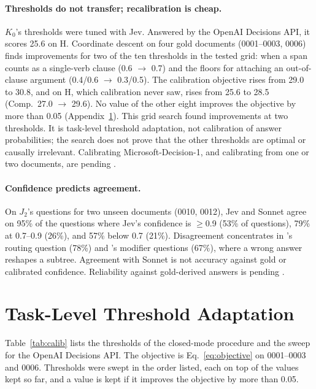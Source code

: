 \paragraph{Thresholds do not transfer; recalibration is cheap.}
$K_0$'s thresholds were tuned with Jev. Answered by the OpenAI Decisions API, it scores 25.6 \F on H. Coordinate descent on four gold documents (0001--0003, 0006) finds improvements for two of the ten thresholds in the tested grid: when a span counts as a single-verb clause (0.6 $\rightarrow$ 0.7) and the floors for attaching an out-of-clause argument (0.4/0.6 $\rightarrow$ 0.3/0.5). The calibration objective rises from 29.0 to 30.8, and on H, which calibration never saw, \F rises from 25.6 to 28.5 (Comp.\ 27.0 $\rightarrow$ 29.6). No value of the other eight improves the objective by more than 0.05 (Appendix~\ref{app:calib}). This grid search found improvements at two thresholds. It is task-level threshold adaptation, not calibration of answer probabilities; the search does not prove that the other thresholds are optimal or causally irrelevant. Calibrating Microsoft-Decision-1, and calibrating from one or two documents, are pending .

\paragraph{Confidence predicts agreement.}
On $J_2$'s questions for two unseen documents (0010, 0012), Jev and Sonnet agree on 95\% of the questions where Jev's confidence is $\geq$0.9 (53\% of questions), 79\% at 0.7--0.9 (26\%), and 57\% below 0.7 (21\%). Disagreement concentrates in 's routing question (78\%) and 's modifier questions (67\%), where a wrong answer reshapes a subtree. Agreement with Sonnet is not accuracy against gold or calibrated confidence. Reliability against gold-derived answers is pending .


\section{Task-Level Threshold Adaptation}
\label{app:calib}
Table~\ref{tab:calib} lists the thresholds of the closed-mode procedure and the sweep for the OpenAI Decisions API. The objective is Eq.~\ref{eq:objective} on 0001--0003 and 0006. Thresholds were swept in the order listed, each on top of the values kept so far, and a value is kept if it improves the objective by more than 0.05.

